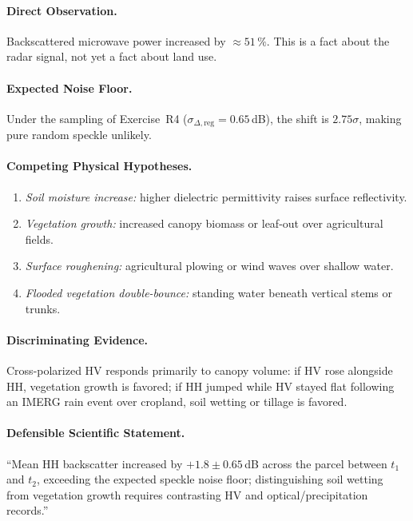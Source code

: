 \documentclass[11pt,a4paper]{article}
\begin{document}
\paragraph{Direct Observation.} Backscattered microwave power increased by $\approx 51\,\%$. This is a fact about the radar signal, not yet a fact about land use.

\paragraph{Expected Noise Floor.} Under the sampling of Exercise~R4 ($\sigma_{\Delta,\text{reg}}=0.65$\,dB), the shift is $2.75\sigma$, making pure random speckle unlikely.

\paragraph{Competing Physical Hypotheses.}
\begin{enumerate}
  \item \emph{Soil moisture increase:} higher dielectric permittivity raises surface reflectivity.
  \item \emph{Vegetation growth:} increased canopy biomass or leaf-out over agricultural fields.
  \item \emph{Surface roughening:} agricultural plowing or wind waves over shallow water.
  \item \emph{Flooded vegetation double-bounce:} standing water beneath vertical stems or trunks.
\end{enumerate}

\paragraph{Discriminating Evidence.} Cross-polarized HV responds primarily to canopy volume: if HV rose alongside HH, vegetation growth is favored; if HH jumped while HV stayed flat following an IMERG rain event over cropland, soil wetting or tillage is favored.

\paragraph{Defensible Scientific Statement.} ``Mean HH backscatter increased by $+1.8\pm0.65$\,dB across the parcel between $t_1$ and $t_2$, exceeding the expected speckle noise floor; distinguishing soil wetting from vegetation growth requires contrasting HV and optical/precipitation records.''
\end{document}
